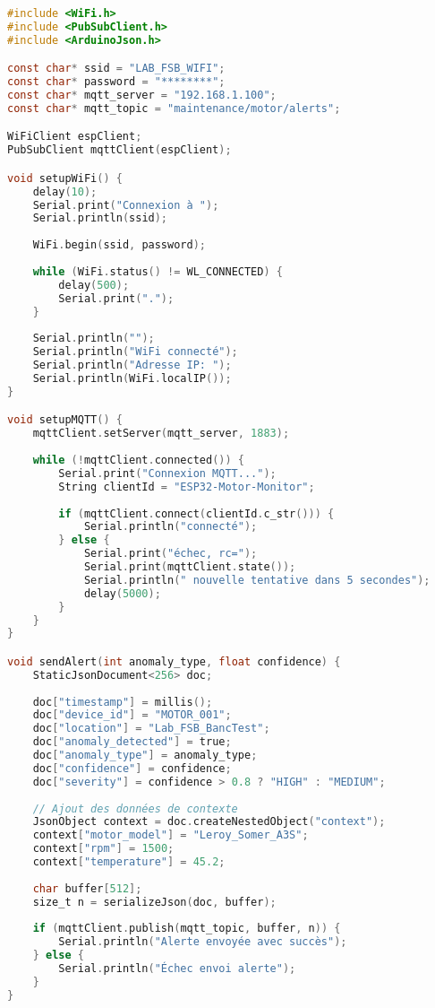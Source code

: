 \begin{lstlisting}[language=C, caption=Gestion des alertes via MQTT]
#include <WiFi.h>
#include <PubSubClient.h>
#include <ArduinoJson.h>

const char* ssid = "LAB_FSB_WIFI";
const char* password = "********";
const char* mqtt_server = "192.168.1.100";
const char* mqtt_topic = "maintenance/motor/alerts";

WiFiClient espClient;
PubSubClient mqttClient(espClient);

void setupWiFi() {
    delay(10);
    Serial.print("Connexion à ");
    Serial.println(ssid);
    
    WiFi.begin(ssid, password);
    
    while (WiFi.status() != WL_CONNECTED) {
        delay(500);
        Serial.print(".");
    }
    
    Serial.println("");
    Serial.println("WiFi connecté");
    Serial.println("Adresse IP: ");
    Serial.println(WiFi.localIP());
}

void setupMQTT() {
    mqttClient.setServer(mqtt_server, 1883);
    
    while (!mqttClient.connected()) {
        Serial.print("Connexion MQTT...");
        String clientId = "ESP32-Motor-Monitor";
        
        if (mqttClient.connect(clientId.c_str())) {
            Serial.println("connecté");
        } else {
            Serial.print("échec, rc=");
            Serial.print(mqttClient.state());
            Serial.println(" nouvelle tentative dans 5 secondes");
            delay(5000);
        }
    }
}

void sendAlert(int anomaly_type, float confidence) {
    StaticJsonDocument<256> doc;
    
    doc["timestamp"] = millis();
    doc["device_id"] = "MOTOR_001";
    doc["location"] = "Lab_FSB_BancTest";
    doc["anomaly_detected"] = true;
    doc["anomaly_type"] = anomaly_type;
    doc["confidence"] = confidence;
    doc["severity"] = confidence > 0.8 ? "HIGH" : "MEDIUM";
    
    // Ajout des données de contexte
    JsonObject context = doc.createNestedObject("context");
    context["motor_model"] = "Leroy_Somer_A3S";
    context["rpm"] = 1500;
    context["temperature"] = 45.2;
    
    char buffer[512];
    size_t n = serializeJson(doc, buffer);
    
    if (mqttClient.publish(mqtt_topic, buffer, n)) {
        Serial.println("Alerte envoyée avec succès");
    } else {
        Serial.println("Échec envoi alerte");
    }
}
\end{lstlisting}

